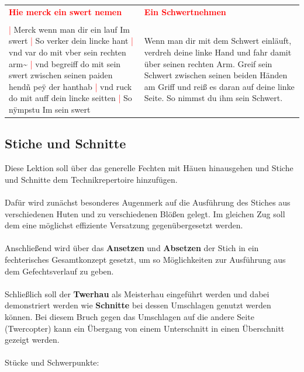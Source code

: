 \begin{longtable}{p{6.25cm}p{6.25cm}}
    \textbf{\textcolor{red}{
        Hie merck ein swert nemen}}
    &
    \textbf{\textcolor{red}{
        Ein Schwertnehmen}}
    \\
    \\
    \textcolor{red}{|} Merck wenn man dir ein lauf Im swert
    \textcolor{red}{|} So verker dein lincke hant
    \textcolor{red}{|} vnd var do mit vber sein rechten arm\textasciitilde{}
    \textcolor{red}{|} vnd begreiff do mit sein swert zwischen seinen paiden hendñ peÿ der hanthab
    \textcolor{red}{|} vnd ruck do mit auff dein lincke seitten
    \textcolor{red}{|} So nÿmpstu Im sein swert
    &
    Wenn man dir mit dem Schwert einläuft, verdreh deine linke Hand und fahr damit über seinen rechten Arm.
    Greif sein Schwert zwischen seinen beiden Händen am Griff und reiß es daran auf deine linke Seite.
    So nimmst du ihm sein Schwert.
\end{longtable}

\newpage

\begin{center}
\end{center}

\newpage

\subsection{Stiche und Schnitte}
\label{sec:stiche_und_schnitte}

Diese Lektion soll über das generelle Fechten mit Häuen hinausgehen und Stiche und Schnitte dem Technikrepertoire hinzufügen.
\\
\\
Dafür wird zunächst besonderes Augenmerk auf die Ausführung des Stiches aus verschiedenen Huten und zu verschiedenen Blößen gelegt.
Im gleichen Zug soll dem eine möglichst effiziente Versatzung gegenübergesetzt werden.
\\
\\
Anschließend wird über das \textbf{Ansetzen} und \textbf{Absetzen} der Stich in ein fechterisches Gesamtkonzept gesetzt, um so Möglichkeiten zur Ausführung aus dem Gefechtsverlauf zu geben.
\\
\\
Schließlich soll der \textbf{Twerhau} als Meisterhau eingeführt werden und dabei demonstriert werden wie \textbf{Schnitte} bei dessen Umschlagen genutzt werden können.
Bei diesem Bruch gegen das Umschlagen auf die andere Seite (Twercopter) kann ein Übergang von einem Unterschnitt in einen Überschnitt gezeigt werden.
\\
\\
Stücke und Schwerpunkte:

